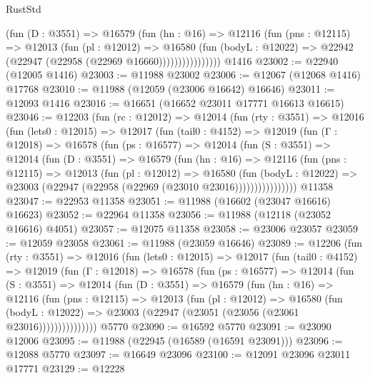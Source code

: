 \begin{lexlean}{RustStd}
\begin{coremodule}
                    (fun (D : @3551) =>
                    @16579
                      (fun (hn : @16) =>
                      @12116
                        (fun (pns : @12115) =>
                        @12013
                          (fun (pl : @12012) =>
                          @16580
                            (fun (bodyL : @12022) =>
                            @22942 (@22947 (@22958 (@22969 @16660))))))))))))))))
    @1416
@23002 := @22940 (@12005 @1416)
@23003 := @11988 @23002
@23006 := @12067 (@12068 @1416) @17768
@23010 := @11988 (@12059 (@23006 @16642) @16646)
@23011 := @12093 @1416
@23016 := @16651 (@16652 @23011 @17771 @16613 @16615)
@23046 := @12203
    (fun (rc : @12012) =>
    @12014
      (fun (rty : @3551) =>
      @12016
        (fun (lets0 : @12015) =>
        @12017
          (fun (tail0 : @4152) =>
          @12019
            (fun (Γ : @12018) =>
            @16578
              (fun (ps : @16577) =>
              @12014
                (fun (S : @3551) =>
                @12014
                  (fun (D : @3551) =>
                  @16579
                    (fun (hn : @16) =>
                    @12116
                      (fun (pns : @12115) =>
                      @12013
                        (fun (pl : @12012) =>
                        @16580
                          (fun (bodyL : @12022) =>
                          @23003 (@22947 (@22958 (@22969 (@23010 @23016))))))))))))))))
    @11358
@23047 := @22953 @11358
@23051 := @11988 (@16602 (@23047 @16616) @16623)
@23052 := @22964 @11358
@23056 := @11988 (@12118 (@23052 @16616) @4051)
@23057 := @12075 @11358
@23058 := @23006 @23057
@23059 := @12059 @23058
@23061 := @11988 (@23059 @16646)
@23089 := @12206
    (fun (rty : @3551) =>
    @12016
      (fun (lets0 : @12015) =>
      @12017
        (fun (tail0 : @4152) =>
        @12019
          (fun (Γ : @12018) =>
          @16578
            (fun (ps : @16577) =>
            @12014
              (fun (S : @3551) =>
              @12014
                (fun (D : @3551) =>
                @16579
                  (fun (hn : @16) =>
                  @12116
                    (fun (pns : @12115) =>
                    @12013
                      (fun (pl : @12012) =>
                      @16580
                        (fun (bodyL : @12022) =>
                        @23003 (@22947 (@23051 (@23056 (@23061 @23016)))))))))))))))
    @5770
@23090 := @16592 @5770
@23091 := @23090 @12006
@23095 := @11988 (@22945 (@16589 (@16591 @23091)))
@23096 := @12088 @5770
@23097 := @16649 @23096
@23100 := @12091 @23096 @23011 @17771
@23129 := @12228

\end{coremodule}
\end{lexlean}
